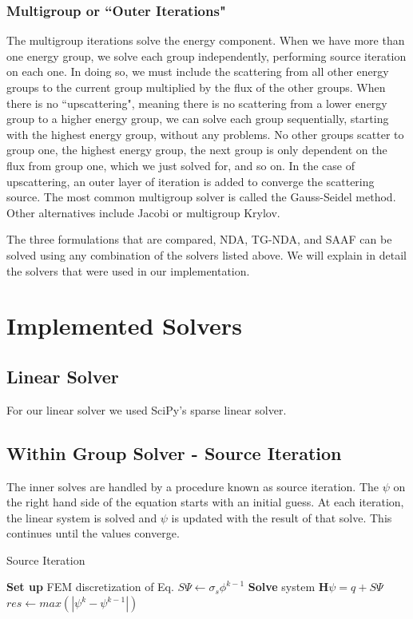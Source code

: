 \subsubsection{Multigroup or ``Outer Iterations"}
The multigroup iterations solve the energy component. When we have more than one energy group, we solve each group independently, performing source iteration on each one. In doing so, we must include the scattering from all other energy groups to the current group multiplied by the flux of the other groups. When there is no ``upscattering", meaning there is no scattering from a lower energy group to a higher energy group, we can solve each group sequentially, starting with the highest energy group, without any problems. No other groups scatter to group one, the highest energy group, the next group is only dependent on the flux from group one, which we just solved for, and so on. In the case of upscattering, an outer layer of iteration is added to converge the scattering source. The most common multigroup solver is called the Gauss-Seidel method. Other alternatives include Jacobi or multigroup Krylov. 

The three formulations that are compared, NDA, TG-NDA, and SAAF can be solved using any combination of the solvers listed above. We will explain in detail the solvers that were used in our implementation. 

\section{Implemented Solvers}
\subsection{Linear Solver}
For our linear solver we used SciPy's sparse linear solver. 

\subsection{Within Group Solver - Source Iteration}
The inner solves are handled by a procedure known as source iteration. The $\psi$ on the right hand side of the equation starts with an initial guess. At each iteration, the linear system is solved and $\psi$ is updated with the result of that solve. This continues until the values converge. 
\begin{algorithm}
\caption{Source Iteration}
\begin{algorithmic}
 
    \State \textbf{Set up} FEM discretization of Eq.
    \State $S\Psi \gets \sigma_s \phi^{k-1}$ 
    \State \textbf{Solve} system $\textbf{H}\psi=q + S\Psi$
    \State $res \gets max(|\psi^{k} - \psi^{k-1}|)$
\EndWhile
\end{algorithmic}
\end{algorithm}

